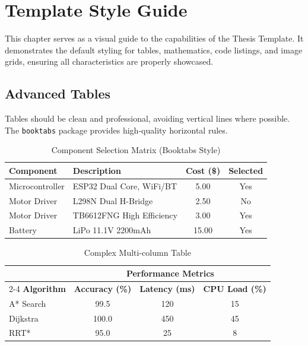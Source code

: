 \chapter{Template Style Guide}
\label{chap:style_guide}

This chapter serves as a visual guide to the capabilities of the Thesis Template. It demonstrates the default styling for tables, mathematics, code listings, and image grids, ensuring all characteristics are properly showcased.

\section{Advanced Tables}
Tables should be clean and professional, avoiding vertical lines where possible. The \texttt{booktabs} package provides high-quality horizontal rules.

\begin{table}[H]
    \centering
    \caption{Component Selection Matrix (Booktabs Style)}
    \label{tab:selection_matrix_showcase}
    \begin{tabularx}{\textwidth}{@{} l X c c @{}}
        \toprule
        \textbf{Component} & \textbf{Description} & \textbf{Cost (\$)} & \textbf{Selected} \\
        \midrule
        Microcontroller & ESP32 Dual Core, WiFi/BT & 5.00 & Yes \\
        Motor Driver & L298N Dual H-Bridge & 2.50 & No \\
        Motor Driver & TB6612FNG High Efficiency & 3.00 & Yes \\
        Battery & LiPo 11.1V 2200mAh & 15.00 & Yes \\
        \bottomrule
    \end{tabularx}
\end{table}

\begin{table}[H]
    \centering
    \caption{Complex Multi-column Table}
    \label{tab:multicol_showcase}
    \begin{tabular}{l c c c}
        \toprule
        & \multicolumn{3}{c}{\textbf{Performance Metrics}} \\
        \cmidrule(lr){2-4}
        \textbf{Algorithm} & \textbf{Accuracy (\%)} & \textbf{Latency (ms)} & \textbf{CPU Load (\%)} \\
        \midrule
        A* Search & 99.5 & 120 & 15 \\
        Dijkstra & 100.0 & 450 & 45 \\
        RRT* & 95.0 & 25 & 8 \\
        \bottomrule
    \end{tabular}
\end{table}

